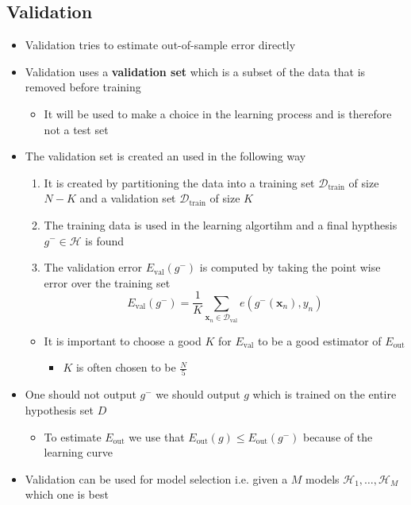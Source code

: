 \documentclass[a4, english]{article}
\begin{document}
\subsection{Validation}
\begin{itemize}
	\item Validation tries to estimate out-of-sample error directly
 	\item Validation uses a \textbf{validation set} which is a subset of the data that is removed before training
  \begin{itemize}
  	\item It will be used to make a choice in the learning process and is therefore not a test set  
  \end{itemize}
  \item The validation set is created an used in the following way
  \begin{enumerate}
     \item It is created by partitioning the data into a training set $\mathcal D_{\text{train}}$ of size $N-K$ and a validation set $\mathcal D_{\text{train}}$ of size $K$ 
    \item The training data is used in the learning algortihm and a final hypthesis $g^- \in \mathcal H$ is found 
    \item The validation error $E_\text{val}(g^-)$ is computed by taking the point wise error over the training set 
\begin{equation*}
  E_\text{val}(g^-)=\frac1K\sum_{\pmb x_n \in \mathcal D_\text{val}} e(g^-(\pmb x_n),y_n)
\end{equation*}
  \end{enumerate}
  \begin{itemize}
  	\item It is important to choose a good $K$ for $E_\text{val}$ to be a good estimator of $E_\text{out}$ 
    \begin{itemize}
      \item $K$ is often chosen to be $\frac N5$ 
    \end{itemize}
  \end{itemize}
  \item One should not output $g^-$ we should output $g$ which is trained on the entire hypothesis set $D$
  \begin{itemize}
  	\item To estimate $E_\text{out}$ we use that $E_\text{out}(g) \leq E_\text{out}(g^-)$ because of the learning curve
  \end{itemize}
  \item Validation can be used for model selection i.e. given a $M$ models $\mathcal H_1, \dots, \mathcal H_M$ which one is best

\end{itemize}
\end{document}
